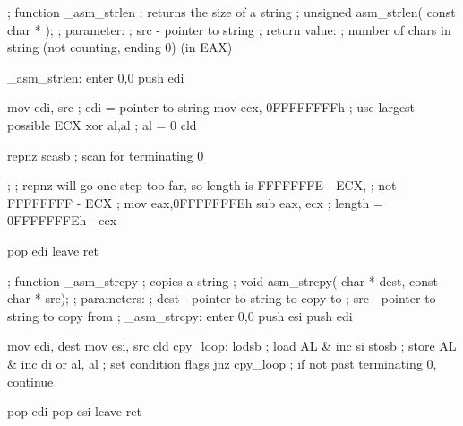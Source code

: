 \begin{AsmCodeListing}[label=memory.asm]
; function _asm_strlen
; returns the size of a string
; unsigned asm_strlen( const char * );
; parameter:
;   src - pointer to string
; return value:
;   number of chars in string (not counting, ending 0) (in EAX)

_asm_strlen:
        enter   0,0
        push    edi

        mov     edi, src        ; edi = pointer to string
        mov     ecx, 0FFFFFFFFh ; use largest possible ECX
        xor     al,al           ; al = 0
        cld

        repnz   scasb           ; scan for terminating 0

;
; repnz will go one step too far, so length is FFFFFFFE - ECX,
; not FFFFFFFF - ECX
;
        mov     eax,0FFFFFFFEh
        sub     eax, ecx        ; length = 0FFFFFFFEh - ecx

        pop     edi
        leave
        ret

; function _asm_strcpy
; copies a string
; void asm_strcpy( char * dest, const char * src);
; parameters:
;   dest - pointer to string to copy to
;   src  - pointer to string to copy from
; 
_asm_strcpy:
        enter   0,0
        push    esi
        push    edi

        mov     edi, dest
        mov     esi, src
        cld
cpy_loop:
        lodsb                   ; load AL & inc si
        stosb                   ; store AL & inc di
        or      al, al          ; set condition flags
        jnz     cpy_loop        ; if not past terminating 0, continue

        pop     edi
        pop     esi
        leave
        ret
\end{AsmCodeListing}

